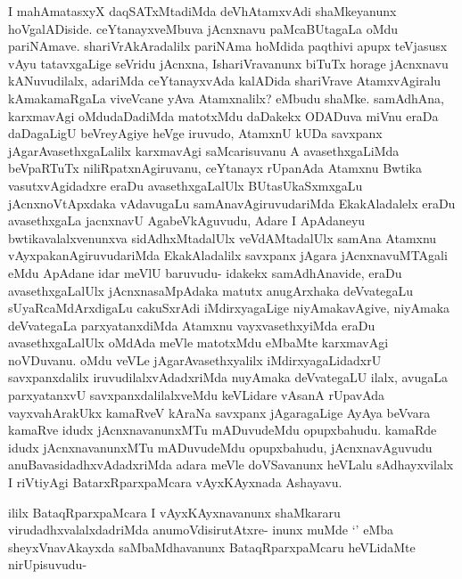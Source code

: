 
\begin{artha}
I mahAmatasxyX daqSATxMtadiMda deVhAtamxvAdi shaMkeyanunx hoVgalADiside. ceYtanayxveMbuva jAcnxnavu paMcaBUtagaLa oMdu pariNAmave. shariVrAkAradalilx pariNAma hoMdida paqthivi apupx teVjasusx vAyu tatavxgaLige seVridu jAcnxna, IshariVravanunx biTuTx horage jAcnxnavu kANuvudilalx, adariMda ceYtanayxvAda kalADida shariVrave AtamxvAgiralu kAmakamaRgaLa viveVcane yAva Atamxnalilx? eMbudu shaMke. samAdhAna, karxmavAgi oMdudaDadiMda matotxMdu daDakekx ODADuva miVnu eraDa daDagaLigU beVreyAgiye heVge iruvudo, AtamxnU kUDa savxpanx jAgarAvasethxgaLalilx karxmavAgi saMcarisuvanu A avasethxgaLiMda beVpaRTuTx niliRpatxnAgiruvanu, ceYtanayx rUpanAda Atamxnu Bwtika vasutxvAgidadxre eraDu avasethxgaLalUlx BUtasUkaSxmxgaLu jAcnxnoVtApxdaka vAdavugaLu samAnavAgiruvudariMda EkakAladalelx eraDu avasethxgaLa jacnxnavU AgabeVkAguvudu, Adare I ApAdaneyu bwtikavalalxvenunxva sidAdhxMtadalUlx  veVdAMtadalUlx samAna Atamxnu vAyxpakanAgiruvudariMda EkakAladalilx savxpanx jAgara jAcnxnavuMTAgali eMdu ApAdane idar meVlU baruvudu- idakekx samAdhAnavide, eraDu avasethxgaLalUlx jAcnxnasaMpAdaka matutx anugArxhaka deVvategaLu sUyaRcaMdArxdigaLu cakuSxrAdi iMdirxyagaLige niyAmakavAgive, niyAmaka deVvategaLa parxyatanxdiMda Atamxnu vayxvasethxyiMda eraDu avasethxgaLalUlx oMdAda meVle matotxMdu eMbaMte karxmavAgi noVDuvanu. oMdu veVLe jAgarAvasethxyalilx iMdirxyagaLidadxrU savxpanxdalilx iruvudilalxvAdadxriMda nuyAmaka deVvategaLU ilalx, avugaLa parxyatanxvU savxpanxdalilalxveMdu keVLidare vAsanA rUpavAda vayxvahArakUkx kamaRveV kAraNa savxpanx jAgaragaLige AyAya beVvara kamaRve idudx jAcnxnavanunxMTu mADuvudeMdu opupxbahudu. kamaRde idudx jAcnxnavanunxMTu mADuvudeMdu opupxbahudu, jAcnxnavAguvudu anuBavasidadhxvAdadxriMda adara meVle doVSavanunx heVLalu sAdhayxvilalx I riVtiyAgi BatarxRparxpaMcara vAyxKAyxnada Ashayavu. 
\end{artha}%


\begin{artha}
ililx BataqRparxpaMcara I vAyxKAyxnavanunx shaMkararu virudadhxvalalxdadriMda anumoVdisirutAtxre- inunx muMde `\stext ' eMba sheyxVnavAkayxda saMbaMdhavanunx BataqRparxpaMcaru heVLidaMte nirUpisuvudu-
\end{artha}


